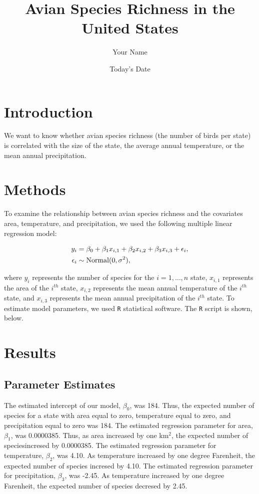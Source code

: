 \documentclass{article}\usepackage[]{graphicx}\usepackage[]{color}
\title{Avian Species Richness in the United States}
\author{Your Name}
\date{Today's Date}
\begin{document}



\maketitle


\section{Introduction}
We want to know whether avian species richness (the number of birds per state) is correlated with the size of the state, the average annual temperature, or the mean annual precipitation.


\section{Methods}
To examine the relationship between avian species richness and the covariates area, temperature, and precipitation, we used the following multiple linear regression model:


\begin{align}
y_i&=\beta_0+\beta_1x_{i,1}+\beta_2x_{i,2}+\beta_3x_{i,3}+\epsilon_i, \notag \\
\epsilon_i &\sim \text{Normal}(0,\sigma^2), \notag
\end{align}

where $y_i$ represents the number of species for the $i=1,\ldots,n$ state, $x_{i,1}$ represents the area of the  $i^{th}$ state, $x_{i,2}$ represents the mean annual temperature of the $i^{th}$ state, and $x_{i,3}$ represents the mean annual precipitation of the $i^{th}$ state. To estimate model parameters, we used \texttt{R} statistical software. The \texttt{R} script is shown, below.





\section{Results}
\subsection{Parameter Estimates}
The estimated intercept of our model, $\beta_0$, was 184. Thus, the expected number of species for a state with area equal to zero, temperature equal to zero, and precipitation equal to zero was 184. The estimated regression parameter for area, $\beta_1$,  was 0.0000385. Thus, as area increased by one km$^2$, the expected number of speciesincresed by 0.0000385. The estimated regression parameter for temperature, $\beta_2$,  was 4.10. As temperature increased by one degree Farenheit, the expected number of species incresed by 4.10. The estimated regression parameter for precipitation, $\beta_3$,  was -2.45. As temperature increased by one degree Farenheit, the expected number of species decresed by 2.45.  
\end{document}
